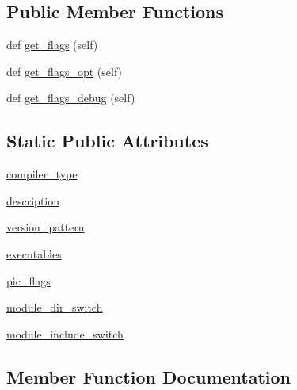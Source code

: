 \subsection*{Public Member Functions}
\begin{DoxyCompactItemize}
\item 
def \hyperlink{classnumpy_1_1distutils_1_1fcompiler_1_1g95_1_1G95FCompiler_a0c344a50a3bdb635671260935d49c093}{get\+\_\+flags} (self)
\item 
def \hyperlink{classnumpy_1_1distutils_1_1fcompiler_1_1g95_1_1G95FCompiler_a47a5711930e21d455c61fffc88a9674c}{get\+\_\+flags\+\_\+opt} (self)
\item 
def \hyperlink{classnumpy_1_1distutils_1_1fcompiler_1_1g95_1_1G95FCompiler_a1073f6beee3c7eb8ed9adebb7cecbca3}{get\+\_\+flags\+\_\+debug} (self)
\end{DoxyCompactItemize}
\subsection*{Static Public Attributes}
\begin{DoxyCompactItemize}
\item 
\hyperlink{classnumpy_1_1distutils_1_1fcompiler_1_1g95_1_1G95FCompiler_a75f759c3d92950c8e08f08bbb113073d}{compiler\+\_\+type}
\item 
\hyperlink{classnumpy_1_1distutils_1_1fcompiler_1_1g95_1_1G95FCompiler_a901f901c60368de3da38daa51b39af63}{description}
\item 
\hyperlink{classnumpy_1_1distutils_1_1fcompiler_1_1g95_1_1G95FCompiler_a665dcbd22e651ea49eb31a4b29fa5e35}{version\+\_\+pattern}
\item 
\hyperlink{classnumpy_1_1distutils_1_1fcompiler_1_1g95_1_1G95FCompiler_a644ab2c75f08f21a0172e2e806bd7fae}{executables}
\item 
\hyperlink{classnumpy_1_1distutils_1_1fcompiler_1_1g95_1_1G95FCompiler_aecbd5f98b0cefe1e488117b0517a8235}{pic\+\_\+flags}
\item 
\hyperlink{classnumpy_1_1distutils_1_1fcompiler_1_1g95_1_1G95FCompiler_aac646c7491a74d4c0f9bb223ca353f4b}{module\+\_\+dir\+\_\+switch}
\item 
\hyperlink{classnumpy_1_1distutils_1_1fcompiler_1_1g95_1_1G95FCompiler_a298c43ff7c18da1f05196fcea7f5176a}{module\+\_\+include\+\_\+switch}
\end{DoxyCompactItemize}


\subsection{Member Function Documentation}
\mbox{\label{classnumpy_1_1distutils_1_1fcompiler_1_1g95_1_1G95FCompiler_a0c344a50a3bdb635671260935d49c093}} 
